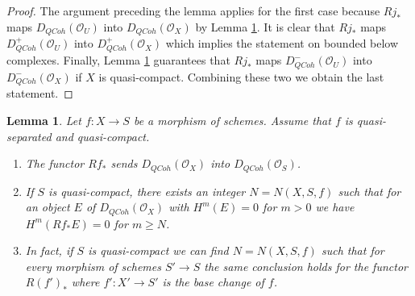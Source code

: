\documentclass{amsart}
\theoremstyle{plain}
\newtheorem{lemma}[subsection]{Lemma}
\theoremstyle{definition}
\theoremstyle{remark}
\numberwithin{equation}{subsection}
\def\QCoh{\mathit{QCoh}}
\begin{document}
\begin{proof}
The argument preceding the lemma applies for the first case because $Rj_*$
maps $D_\QCoh(\mathcal{O}_U)$ into $D_\QCoh(\mathcal{O}_X)$
by Lemma \ref{lemma-quasi-coherence-direct-image}.
It is clear that $Rj_*$ maps
$D^+_\QCoh(\mathcal{O}_U)$ into
$D^+_\QCoh(\mathcal{O}_X)$
which implies the statement on bounded below complexes.
Finally, Lemma \ref{lemma-quasi-coherence-direct-image}
guarantees that $Rj_*$ maps
$D^-_\QCoh(\mathcal{O}_U)$ into
$D^-_\QCoh(\mathcal{O}_X)$
if $X$ is quasi-compact. Combining these two we obtain the last statement.
\end{proof}


\begin{lemma}
\label{lemma-quasi-coherence-direct-image}
Let $f : X \to S$ be a morphism of schemes.
Assume that $f$ is quasi-separated and quasi-compact.
\begin{enumerate}
\item The functor $Rf_*$ sends $D_\QCoh(\mathcal{O}_X)$
into $D_\QCoh(\mathcal{O}_S)$.
\item If $S$ is quasi-compact, there exists an integer $N = N(X, S, f)$
such that for an object $E$ of $D_\QCoh(\mathcal{O}_X)$
with $H^m(E) = 0$ for $m > 0$ we have
$H^m(Rf_*E) = 0$ for $m \geq N$.
\item In fact, if $S$ is quasi-compact we can find $N = N(X, S, f)$
such that for every morphism of schemes $S' \to S$
the same conclusion holds for the functor $R(f')_*$
where $f' : X' \to S'$ is the base change of $f$.
\end{enumerate}
\end{lemma}
\end{document}
